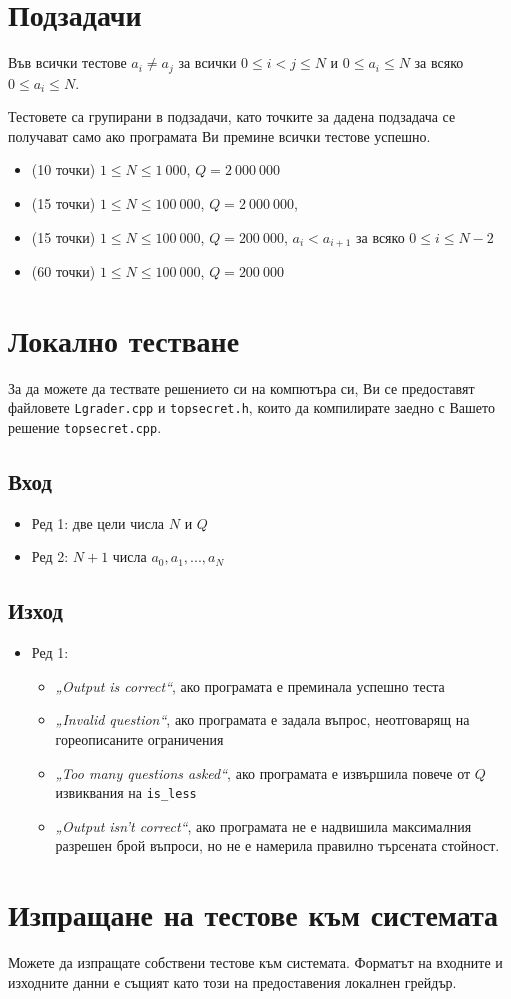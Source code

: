 \documentclass[a4paper,11pt]{article}
\newcommand{\code}[1]{\texttt{#1}}
\newcommand{\noskip}{\vspace{-\parskip}}
\begin{document}
\section*{Подзадачи}
Във всички тестове $a_i \neq a_j$ за всички $0 \leq i < j \leq N$ и 
$0 \leq a_i \leq N$ за всяко $0 \leq a_i \leq N$.

Тестовете са групирани в подзадачи, като точките за дадена подзадача се
получават само ако програмата Ви премине всички тестове успешно.
\noskip
\begin{itemize}
    \item (10 точки) $1 \leq N \leq 1\ 000$, $Q = 2\ 000\ 000$
    \item (15 точки) $1 \leq N \leq 100\ 000$, $Q = 2\ 000\ 000$,
    \item (15 точки) $1 \leq N \leq 100\ 000$, $Q = 200\ 000$, $a_i < a_{i+1}$
        за всяко $0 \leq i \leq N-2$
    \item (60 точки) $1 \leq N \leq 100\ 000$, $Q = 200\ 000$
\end{itemize}

\section*{Локално тестване}
За да можете да тествате решението си на компютъра си, Ви се предоставят
файловете \code{Lgrader.cpp} и \code{topsecret.h}, които да компилирате
заедно с Вашето решение \code{topsecret.cpp}.

\noskip
\subsection*{Вход}
\noskip
\begin{itemize}
    \item Ред 1: две цели числа $N$ и $Q$
    \item Ред 2: $N + 1$ числа $a_0, a_1, ..., a_{N}$
\end{itemize}
\noskip
\subsection*{Изход}
\noskip
\begin{itemize}
    \item Ред 1:
    \begin{itemize}
        \item \textit{„Output is correct“}, ако програмата е преминала успешно
            теста
        \item \textit{„Invalid question“}, ако програмата е задала въпрос,
            неотговарящ на гореописаните ограничения
        \item \textit{„Too many questions asked“}, ако програмата е извършила
            повече от $Q$ извиквания на \code{is\_less}
        \item \textit{„Output isn't correct“}, ако програмата не е надвишила
            максималния разрешен брой въпроси, но не е намерила правилно
            търсената стойност.
    \end{itemize}
\end{itemize}

\section*{Изпращане на тестове към системата}
Можете да изпращате собствени тестове към системата. Форматът на входните и
изходните данни е същият като този на предоставения локалнен грейдър.
\end{document}
